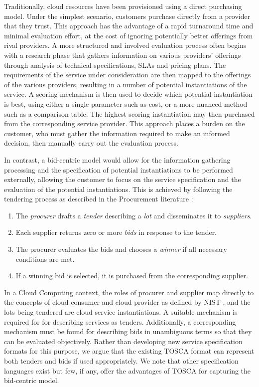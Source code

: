 \documentclass[10pt, conference, compsocconf]{IEEEtran}
\begin{document}
\label{sec:bid-centric-provisioning}

Traditionally, cloud resources have been provisioned using a direct purchasing model. Under the simplest scenario, customers purchase directly from a provider that they trust. This approach has the advantage of a rapid turnaround time and minimal evaluation effort, at the cost of ignoring potentially better offerings from rival providers. A more structured and involved evaluation process often begins with a research phase that gathers information on various providers' offerings through analysis of technical specifications, SLAs and pricing plans. The requirements of the service under consideration are then mapped to the offerings of the various providers, resulting in a number of potential instantiations of the service. A scoring mechanism is then used to decide which potential instantiation is best, using either a single parameter such as cost, or a more nuanced method such as a comparison table. The highest scoring instantiation may then purchased from the corresponding service provider. This approach places a burden on the customer, who must gather the information required to make an informed decision, then manually carry out the evaluation process.

In contrast, a bid-centric model would allow for the information gathering processing and the specification of potential instantiations to be performed externally, allowing the customer to focus on the service specification and the evaluation of the potential instantiations. This is achieved by following the tendering process as described in the Procurement literature \cite{dimitri2006handbook}:

\begin{enumerate}
\item The \textit{procurer} drafts a \textit{tender} describing a \textit{lot} and disseminates it to \textit{suppliers}.
\item Each supplier returns zero or more \textit{bids} in response to the tender.
\item The procurer evaluates the bids and chooses a \textit{winner} if all necessary conditions are met.
\item If a winning bid is selected, it is purchased from the corresponding supplier.
\end{enumerate}

In a Cloud Computing context, the roles of procurer and supplier map directly to the concepts of cloud consumer and cloud provider as defined by NIST \cite{mell2011nist}, and the lots being tendered are cloud service instantiations. A suitable mechanism is required for for describing services as tenders. Additionally, a corresponding mechanism must be found for describing bids in unambiguous terms so that they can be evaluated objectively. Rather than developing new service specification formats for this purpose, we argue that the existing TOSCA format can represent both tenders and bids if used appropriately. We note that other specification languages exist but few, if any, offer the advantages of TOSCA for capturing the bid-centric model.
\end{document}
